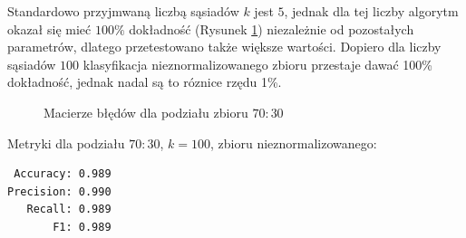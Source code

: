 \documentclass[12pt,a4paper]{article}
\begin{document}
            Standardowo przyjmwaną liczbą sąsiadów $k$ jest $5$, jednak dla tej liczby algorytm okazał się mieć $100\%$ dokładność (Rysunek \ref{fig:conf-matrix-70}) niezależnie od pozostałych parametrów, dlatego przetestowano także większe wartości. Dopiero dla liczby sąsiadów $100$ klasyfikacja nieznormalizowanego zbioru przestaje dawać 100\% dokładność, jednak nadal są to róznice rzędu 1\%.
            
            \begin{figure}[h!]
    			\centering
    			\hfil
    			\caption{Macierze błędów dla podziału zbioru $70:30$}
    			\label{fig:conf-matrix-70}
    		\end{figure}
    		Metryki dla podziału $70:30$, $k=100$, zbioru nieznormalizowanego:
    		\begin{verbatim}
 Accuracy: 0.989
Precision: 0.990
   Recall: 0.989
       F1: 0.989
    		\end{verbatim}
    		
\end{document}
